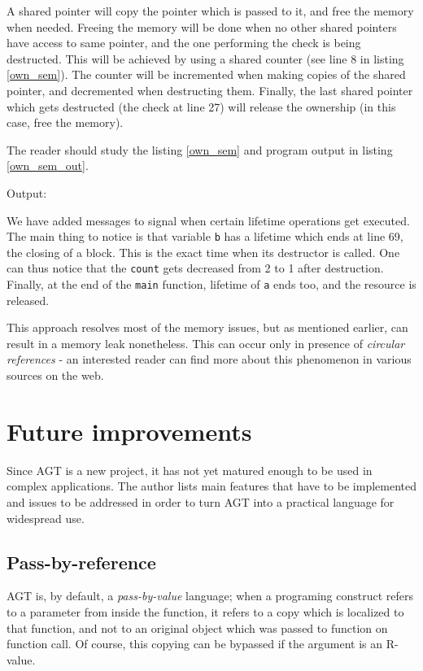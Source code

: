 \documentclass[times, utf8, diplomski]{fer}
\theoremstyle{definition}
\newcommand{\textcode}[3]{
    
}
\begin{document}
A shared pointer will copy the pointer which is passed to it, and free the memory when needed. 
Freeing the memory will be done when no other shared pointers have access to same pointer,
and the one performing the check is being destructed.
This will be achieved by using a shared counter (see line 8 in listing \ref{own_sem}).
The counter will be incremented when making copies of the shared pointer,
and decremented when destructing them.
Finally, the last shared pointer which gets destructed (the check at line 27) will release
the ownership (in this case, free the memory).

The reader should study the listing \ref{own_sem} and program output in listing \ref{own_sem_out}.

\textcode{\resdir/programs/shared_pointer.agt}{own_sem}{Shared pointers - out}

Output:
\textcode{\resdir/programs/shared_pointer.out}{own_sem_out}{Shared pointer - out}

We have added messages to signal when certain lifetime operations get executed.
The main thing to notice is that variable \texttt{b} has a lifetime which ends
at line 69, the closing of a block. This is the exact time when its destructor is called.
One can thus notice that the \texttt{count} gets decreased from 2 to 1 after destruction.
Finally, at the end of the \texttt{main} function, lifetime of \texttt{a} ends too,
and the resource is released.

This approach resolves most of the memory issues, but as mentioned earlier, can result
in a memory leak nonetheless. This can occur only in presence of \textit{circular references} -
an interested reader can find more about this phenomenon in various sources on the web.


\chapter{Future improvements}\label{chap:improv}

Since AGT is a new project, it has not yet matured enough to be used in complex applications.
The author lists main features that have to be implemented and issues to be addressed
in order to turn AGT into a practical language for widespread use.

\section{Pass-by-reference}

AGT is, by default, a \textit{pass-by-value} language; when a programing construct 
refers to a parameter from inside the function, it refers to a copy which is localized to that function,
and not to an original object which was passed to function on function call.
Of course, this copying can be bypassed if the argument is an R-value.
\end{document}
